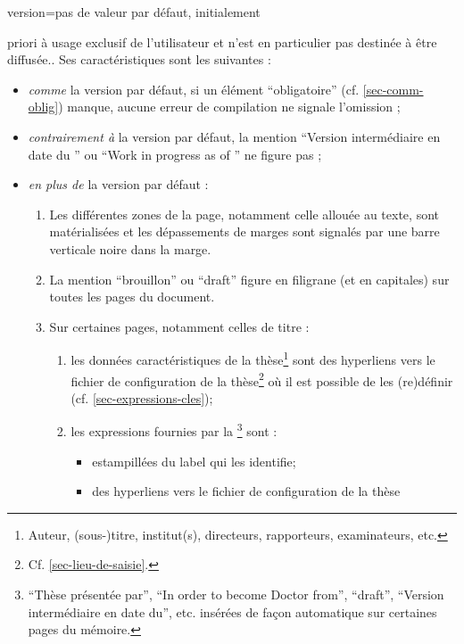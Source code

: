 {\begin{docKey}{version}{=\textbar{}\textbar{}\textbar{}\textbar{}\textbar{}}{pas
      de valeur par défaut, initialement }
\begin{description}
{{          priori} à usage exclusif de l'utilisateur et n'est en particulier pas
        destinée à être diffusée.}. Ses caractéristiques sont les suivantes :
      \begin{itemize}
      \item \emph{comme} la version par défaut, si un élément
        \enquote{obligatoire} (cf. \vref{sec-comm-oblig}) manque, aucune erreur
        de compilation ne signale l'omission ;
      \item \emph{contrairement à} la version par défaut, la mention
        \enquote{Version intermédiaire en date du } ou
        \foreignquote{english}{Work in progress as of } ne
        figure pas ;
      \item \emph{en plus de} la version par défaut :
        \begin{enumerate}
        \item Les différentes zones de la page, notamment celle allouée au
          texte, sont matérialisées et les dépassements de marges sont signalés
          par une barre verticale noire dans la marge.
        \item La mention \enquote{brouillon} ou
          \foreignquote{english}{draft}\selonlangue{} figure en filigrane (et en
          capitales) sur toutes les pages du document.
        \item Sur certaines pages, notamment celles de titre :
          \begin{enumerate}
          \item les données caractéristiques de la thèse\footnote{Auteur,
              (sous-)titre, institut(s), directeurs, rapporteurs, examinateurs,
              etc.} sont des hyperliens vers le fichier de configuration de la
            thèse\footnote{Cf. \vref{sec-lieu-de-saisie}.} où il est possible de
            les (re)définir (cf. \vref{sec-expressions-cles});
          \item\label{item-expression} les expressions fournies par la
            \yatcl\footnote{\enquote{Thèse présentée par},
              \foreignquote{english}{In order to become Doctor from},
              \foreignquote{english}{draft}, \enquote{Version intermédiaire en
                date du}, etc. insérées de façon automatique sur certaines pages
              du mémoire.} sont :
            \begin{itemize}
            \item estampillées du label qui les identifie;
            \item des hyperliens vers le fichier de configuration de la thèse

\end{itemize}
\end{enumerate}
\end{enumerate}
\end{itemize}
\end{description}
\end{docKey}}
